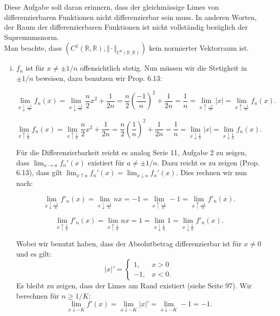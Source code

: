 \documentclass[a4paper, 20]{exam}
\newcommand\RR{\mathbb{R}}
\begin{document}
\begin{solution}
Diese Aufgabe soll daran erinnern, dass der gleichm\"assige Limes von differenzierbaren Funktionen nicht differenzierbar sein muss. In anderen Worten, der Raum der differenzierbaren Funktionen ist nicht vollst\"andig bez\"uglich der Supremumsnorm. \\
Man beachte, dass $(C^1(\RR, \RR), \Vert \cdot \Vert_{C^0(\RR, \RR)})$ kein normierter Vektorraum ist.
\begin{enumerate}[i.)]
\item
$f_n$ ist f\"ur $x \neq \pm 1/n$ offensichtlich stetig. Nun m\"ussen wir die Stetigkeit in $\pm 1/n$ beweisen, dazu benutzen wir Prop. 6.13:

$$ \lim_{x \downarrow \frac{-1}{n}}f_n(x) 
= \lim_{x\downarrow \frac{-1}{n}} \frac{n}{2} x^2 + \frac{1}{2n}
=  \frac{n}{2} \left( \frac{-1}{n} \right)^2 + \frac{1}{2n}
= \frac{1}{n}
= \lim_{x\uparrow \frac{-1}{n}} \vert x \vert
= \lim_{x\uparrow \frac{-1}{n}}f_n(x) .$$

$$ \lim_{x\uparrow \frac{1}{n}}f_n(x) 
= \lim_{x\uparrow \frac{1}{n}} \frac{n}{2}x^2 + \frac{1}{2n}
=  \frac{n}{2} \left( \frac{1}{n} \right)^2 + \frac{1}{2n}
= \frac{1}{n}
= \lim_{x\downarrow \frac{1}{n}} \vert x \vert
= \lim_{x\downarrow \frac{1}{n}}f_n(x).$$

F\"ur die Differenzierbarkeit reicht es analog Serie 11, Aufgabe 2 zu zeigen, dass $\lim_{x\rightarrow a} f_n'(x)$ existiert f\"ur $a\neq \pm 1/n$. Dazu reicht es zu zeigen (Prop. 6.13), dass gilt $\lim_{x\uparrow a} f_n'(x) = \lim_{x\downarrow a}f_n'(x)$. Dies rechnen wir nun nach:

$$ \lim_{x \downarrow \frac{-1}{n}}f'_n(x) 
= \lim_{x\downarrow \frac{-1}{n}} n x
=  -1 
= \lim_{x\uparrow \frac{-1}{n}} -1
= \lim_{x\uparrow \frac{-1}{n}}f'_n(x) .$$

$$ \lim_{x\uparrow \frac{1}{n}}f'_n(x) = \lim_{x\uparrow \frac{1}{n}}nx = 1 = \lim_{x\downarrow \frac{1}{n}} 1
= \lim_{x\downarrow \frac{1}{n}}f'_n(x).$$

Wobei wir benutzt haben, dass der Absolutbetrag differenzierbar ist f\"ur $x\neq 0$ und es gilt:
$$ \vert x \vert' = 
\left\{\begin{array}{lr} 1 , & x>0\\
-1,  & x<0. \end{array}\right. $$
Es bleibt zu zeigen, dass der Limes am Rand existiert (siehe Seite 97). Wir berechnen f\"ur $n\geq 1/K$:
$$ \lim_{x \downarrow -K} f'(x) 
= \lim_{x \downarrow -K} \vert x \vert '
= \lim_{x \downarrow -K} -1
=-1.$$


\end{enumerate}
\end{solution}
\end{document}
